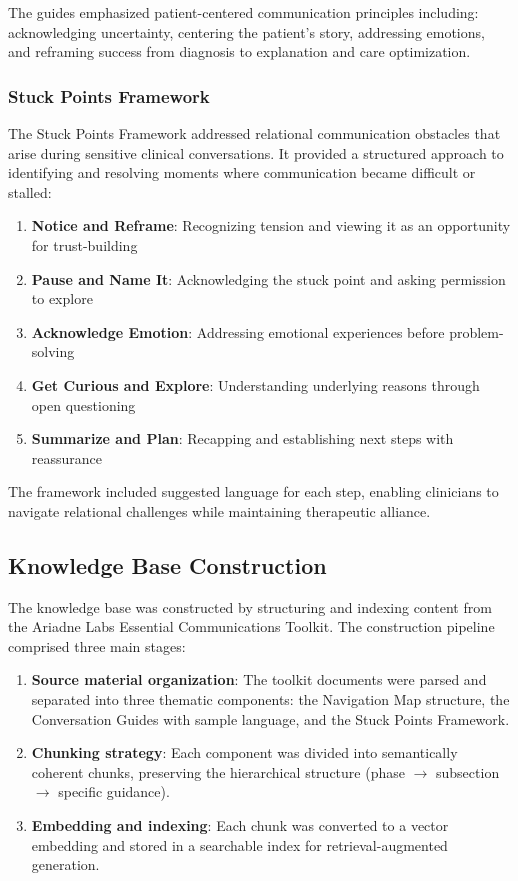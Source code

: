 The guides emphasized patient-centered communication principles including:
acknowledging uncertainty, centering the patient's story, addressing emotions, and reframing success from diagnosis to explanation and care optimization.

\subsubsection{Stuck Points Framework}

The Stuck Points Framework addressed relational communication obstacles that arise during sensitive clinical conversations. It provided a structured approach to identifying and resolving moments where communication became difficult or stalled:

\begin{enumerate}
    \item \textbf{Notice and Reframe}: Recognizing tension and viewing it as an opportunity for trust-building
    \item \textbf{Pause and Name It}: Acknowledging the stuck point and asking permission to explore
    \item \textbf{Acknowledge Emotion}: Addressing emotional experiences before problem-solving
    \item \textbf{Get Curious and Explore}: Understanding underlying reasons through open questioning
    \item \textbf{Summarize and Plan}: Recapping and establishing next steps with reassurance
\end{enumerate}

The framework included suggested language for each step, enabling clinicians to navigate relational challenges while maintaining therapeutic alliance.



\subsection{Knowledge Base Construction}\label{sec:knowledge_base}

The knowledge base was constructed by structuring and indexing content from the Ariadne Labs Essential Communications Toolkit. The construction pipeline comprised three main stages:

\begin{enumerate}
    \item \textbf{Source material organization}: The toolkit documents were parsed and separated into three thematic components: the Navigation Map structure, the Conversation Guides with sample language, and the Stuck Points Framework.
    \item \textbf{Chunking strategy}: Each component was divided into semantically coherent chunks, preserving the hierarchical structure (phase $\rightarrow$ subsection $\rightarrow$ specific guidance).
    \item \textbf{Embedding and indexing}: Each chunk was converted to a vector embedding and stored in a searchable index for retrieval-augmented generation.
\end{enumerate}

